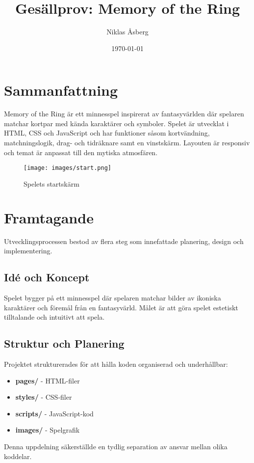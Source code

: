 \documentclass[a4paper,12pt]{article}
\title{\textbf{Gesällprov: Memory of the Ring}}
\author{Niklas Åsberg}
\date{\today}
\begin{document}
\maketitle

\section*{Sammanfattning}
Memory of the Ring är ett minnesspel inspirerat av fantasyvärlden där spelaren matchar kortpar med kända karaktärer och symboler. Spelet är utvecklat i HTML, CSS och JavaScript och har funktioner såsom kortvändning, matchningslogik, drag- och tidräknare samt en vinstskärm. Layouten är responsiv och temat är anpassat till den mytiska atmosfären.

\begin{figure}[h]
    \centering
    \texttt{[image: images/start.png]}
    \caption{Spelets startskärm}
    \label{fig:game_start}
\end{figure}

\section*{Framtagande}
Utvecklingsprocessen bestod av flera steg som innefattade planering, design och implementering.

\subsection*{Idé och Koncept}
Spelet bygger på ett minnesspel där spelaren matchar bilder av ikoniska karaktärer och föremål från en fantasyvärld. Målet är att göra spelet estetiskt tilltalande och intuitivt att spela.

\subsection*{Struktur och Planering}
Projektet strukturerades för att hålla koden organiserad och underhållbar:
\begin{itemize}
    \item \textbf{pages/} - HTML-filer
    \item \textbf{styles/} - CSS-filer
    \item \textbf{scripts/} - JavaScript-kod
    \item \textbf{images/} - Spelgrafik
\end{itemize}
Denna uppdelning säkerställde en tydlig separation av ansvar mellan olika koddelar.
\end{document}
